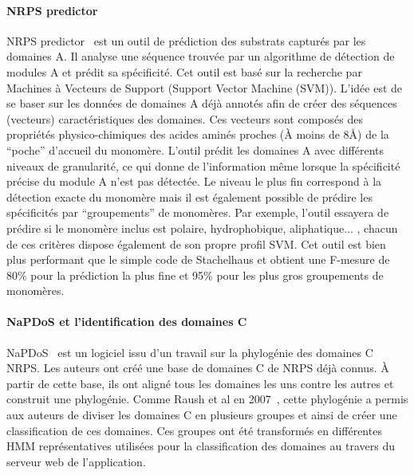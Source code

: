 \documentclass[12pt,french,twoside]{report}
\begin{document}
\paragraph{NRPS predictor}
NRPS predictor~\cite{rottig_nrpspredictor2web_2011,rausch_specificity_2005} est un outil de prédiction des substrats capturés par les domaines A.
Il analyse une séquence trouvée par un algorithme de détection de modules A et prédit sa spécificité.
Cet outil est basé sur la recherche par Machines à Vecteurs de Support (Support Vector Machine (SVM)).
L'idée est de se baser sur les données de domaines A déjà annotés afin de créer des séquences (vecteurs) caractéristiques des domaines.
Ces vecteurs sont composés des propriétés physico-chimiques des acides aminés proches (À moins de 8Å) de la ``poche'' d'accueil du monomère.
L'outil prédit les domaines A avec différents niveaux de granularité, ce qui donne de l'information même lorsque la spécificité précise du module A n'est pas détectée.
Le niveau le plus fin correspond à la détection exacte du monomère mais il est également possible de prédire les spécificités par ``groupements'' de monomères.
Par exemple, l'outil essayera de prédire si le monomère inclus est polaire, hydrophobique, aliphatique... , chacun de ces critères dispose également de son propre profil SVM.
Cet outil est bien plus performant que le simple code de Stachelhaus et obtient une F-mesure de 80\% pour la prédiction la plus fine et 95\% pour les plus gros groupements de monomères.


\paragraph{NaPDoS et l'identification des domaines C}
NaPDoS~\cite{ziemert_natural_2012} est un logiciel issu d'un travail sur la phylogénie des domaines C NRPS.
Les auteurs ont créé une base de domaines C de NRPS déjà connus.
À partir de cette base, ils ont aligné tous les domaines les uns contre les autres et construit une phylogénie.
Comme Raush et al en 2007~\cite{rausch_phylogenetic_2007}, cette phylogénie a permis aux auteurs de diviser les domaines C en plusieurs groupes et ainsi de créer une classification de ces domaines.
Ces groupes ont été transformés en différentes HMM représentatives utilisées pour la classification des domaines au travers du serveur web de l'application.


\end{document}
